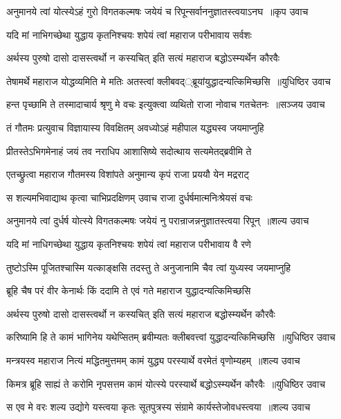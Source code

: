 \threelineshloka
{अनुमानये त्वां योत्स्येऽहं गुरो विगतकल्मषः}
{जयेयं च रिपून्सर्वाननुज्ञातस्त्वयाऽनघ ॥कृप उवाच}
{}


\twolineshloka
{यदि मां नाभिगच्छेथा युद्धाय कृतनिश्चयः}
{शपेयं त्वां महाराज परीभावाय सर्वशः}


\threelineshloka
{अर्थस्य पुरुषो दासो दासस्त्वर्थो न कस्यचित्}
{इति सत्यं महाराज बद्धोऽस्म्यर्थेन कौरवैः}
{}


\threelineshloka
{तेषामर्थे महाराज योद्धव्यमिति मे मतिः}
{अतस्त्वां क्लीबवद््ब्रूयांयुद्धादन्यत्किमिच्छसि ॥युधिष्ठिर उवाच}
{}


\twolineshloka
{हन्त पृच्छामि ते तस्मादाचार्य श्रृणु मे वचः}
{इत्युक्त्वा व्यथितो राजा नोवाच गतचेतनः ॥सञ्जय उवाच}


\twolineshloka
{तं गौतमः प्रत्युवाच विज्ञायास्य विवक्षितम्}
{अवध्योऽहं महीपाल यद्ध्यस्व जयमाप्नुहि}


\twolineshloka
{प्रीतस्तेऽभिगमेनाहं जयं तव नराधिप}
{आशासिष्ये सदोत्थाय सत्यमेतद्ब्रवीमि ते}


\twolineshloka
{एतच्छ्रुत्वा महाराज गौतमस्य विशांपते}
{अनुमान्य कृपं राजा प्रययौ येन मद्रराट्}


\twolineshloka
{स शल्यमभिवाद्याथ कृत्वा चाभिप्रदक्षिणम्}
{उवाच राजा दुर्धर्षमात्मनिःश्रेयसं वचः}


\threelineshloka
{अनुमानये त्वां दुर्धर्ष योत्स्ये विगतकल्मषः}
{जयेयं नु परान्राजन्ननुज्ञातस्त्वया रिपून् ॥शल्य उवाच}
{}


\twolineshloka
{यदि मां नाधिगच्छेथा युद्धाय कृतनिश्चयः}
{शपेयं त्वां महाराज परीभावाय वै रणे}


\twolineshloka
{तुष्टोऽस्मि पूजितश्चास्मि यत्काङ्क्षसि तदस्तु ते}
{अनुजानामि चैव त्वां युध्यस्व जयमाप्नुहि}


\twolineshloka
{ब्रूहि चैष परं वीर केनार्थः किं ददामि ते}
{एवं गते महाराज युद्धादन्यत्किमिच्छसि}


\twolineshloka
{अर्थस्य पुरुषो दासो दासस्त्वर्थो न कस्यचित्}
{इति सत्यं महाराज बद्धोस्म्यर्थेन कौरवैः}


\threelineshloka
{करिष्यामि हि ते कामं भागिनेय यथेप्सितम्}
{ब्रवीम्यतः क्लीबवत्त्वां युद्धादन्यत्किमिच्छसि ॥युधिष्ठिर उवाच}
{}


\threelineshloka
{मन्त्रयस्व महाराज नित्यं मद्धितमुत्तमम्}
{कामं युद्ध्य परस्यार्थे वरमेतं वृणोम्यहम् ॥शल्य उवाच}
{}


\threelineshloka
{किमत्र ब्रूहि साह्यं ते करोमि नृपसत्तम}
{कामं योत्स्ये परस्यार्थे बद्धोऽस्म्यर्थेन कौरवैः ॥युधिष्ठिर उवाच}
{}


\threelineshloka
{स एव मे वरः शल्य उद्योगे यस्त्वया कृतः}
{सूतपुत्रस्य संग्रामे कार्यस्तेजोवधस्त्वया ॥शल्य उवाच}
{}


